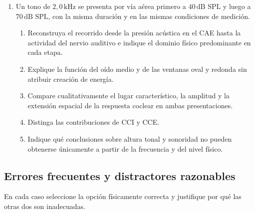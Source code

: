\begin{enumerate}[label=\textbf{P\arabic*.},leftmargin=*]
    \item Un tono de \(2{,}0\,\text{kHz}\) se presenta por vía aérea primero a
    \(40\,\text{dB SPL}\) y luego a \(70\,\text{dB SPL}\), con la misma
    duración y en las mismas condiciones de medición.
    \begin{enumerate}[label=\alph*)]
        \item Reconstruya el recorrido desde la presión acústica en el CAE
        hasta la actividad del nervio auditivo e indique el dominio físico
        predominante en cada etapa.
        \item Explique la función del oído medio y de las ventanas oval y
        redonda sin atribuir creación de energía.
        \item Compare cualitativamente el lugar característico, la amplitud y
        la extensión espacial de la respuesta coclear en ambas presentaciones.
        \item Distinga las contribuciones de CCI y CCE.
        \item Indique qué conclusiones sobre altura tonal y sonoridad no pueden
        obtenerse únicamente a partir de la frecuencia y del nivel físico.
    \end{enumerate}
\end{enumerate}

\subsection*{Errores frecuentes y distractores razonables}

En cada caso seleccione la opción físicamente correcta y justifique por qué
las otras dos son inadecuadas.

